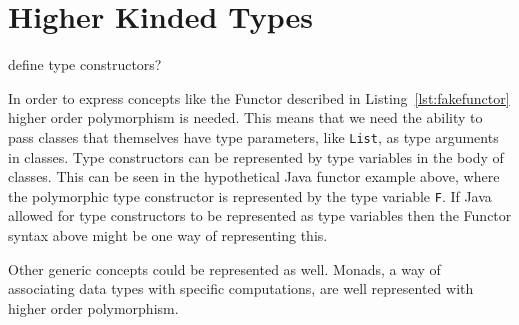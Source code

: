 \section{Higher Kinded Types}
define type constructors?

In order to express concepts like the Functor described in Listing~\ref{lst:fakefunctor}
higher order polymorphism is needed. This means that we need the ability to pass
classes that themselves have type parameters, like \lstinline{List}, as type
arguments in classes. Type constructors can be represented by type variables in
the body of classes. This can be seen in the hypothetical Java functor example
above, where the polymorphic type constructor is represented by the type variable
\lstinline{F}. If Java allowed for type constructors to be represented as type
variables then the Functor syntax above might be one way of representing this.

Other generic concepts could be represented as well. Monads, a way of associating
data types with specific computations, are well represented with higher order
polymorphism. 

